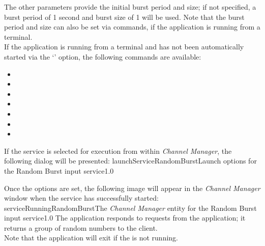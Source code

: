 The other parameters provide the initial burst period and size; if not specified, a burst
period of 1 second and burst size of 1 will be used.
Note that the burst period and size can also be set via commands, if the application is
running from a terminal.\\

If the application is running from a terminal and has not been automatically started via
the `' option, the following commands are available:
\begin{itemize}
\item{}
\item\exSp{}
\item\exSp{}
\item\exSp{}
\item\exSp{}
\item\exSp{}
\item\exSp{}
\end{itemize}
\condPage
If the service is selected for execution from within \emph{Channel Manager}, the following
dialog will be presented:
%
{launchServiceRandomBurst}{Launch options for the Random Burst input service}{1.0}

Once the options are set, the following image will appear in the \emph{Channel Manager}
window when the service has successfully started:
%
{serviceRunningRandomBurst}{The \emph{Channel Manager} entity for the Random Burst input
service}{1.0}
\condPage
{}
The  application responds to
 requests from the
 application; it returns a group of random
numbers to the client.\\

Note that the application will exit if the
 is not running.\\

